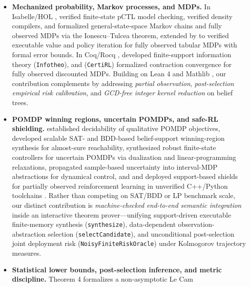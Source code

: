 \documentclass[11pt,a4paper]{article}
\providecommand{\tightlist}{\setlength{\itemsep}{2pt}\setlength{\parskip}{0pt}}
\begin{document}
\begin{itemize}
\tightlist
\item
  \textbf{Mechanized probability, Markov processes, and MDPs.} In
  Isabelle/HOL \citep{nipkowPaulsonWenzel2002}, \citet{hoelzlNipkow2012}
  verified finite-state pCTL model checking, \citet{eberl2015} verified
  density compilers, and \citet{hoelzl2017} formalized
  general-state-space Markov chains and fully observed MDPs via the
  Ionescu--Tulcea theorem, extended by \citet{schaeffelerAbdulaziz2023}
  to verified executable value and policy iteration for fully observed
  tabular MDPs with formal error bounds. In Coq/Rocq
  \citep{bertotCasteran2004}, \citet{affeldt2014} developed
  finite-support information theory (\texttt{Infotheo}), and
  \citet{vajjha2021} (\texttt{CertiRL}) formalized contraction
  convergence for fully observed discounted MDPs. Building on Lean 4
  \citep{mouraUllrich2021} and Mathlib \citep{mathlib2020}, our
  contribution complements \citet{schaeffelerAbdulaziz2023} by
  addressing \emph{partial observation}, \emph{post-selection empirical
  risk calibration}, and \emph{GCD-free integer kernel reduction} on
  belief trees.
\item
  \textbf{POMDP winning regions, uncertain POMDPs, and safe-RL
  shielding.} \citet{chatterjee2016} established decidability of
  qualitative POMDP objectives, \citet{junges2021} developed scalable
  SAT- and BDD-based belief-support winning-region synthesis for
  almost-sure reachability, \citet{cubuktepe2021} synthesized robust
  finite-state controllers for uncertain POMDPs via dualization and
  linear-programming relaxations, \citet{badings2023} propagated
  sample-based uncertainty into interval-MDP abstractions for dynamical
  control, and \citet{alshiekh2018} and \citet{carr2023} deployed
  support-based shields for partially observed reinforcement learning in
  unverified C++/Python toolchains \citep{kwiatkowska2011, dehnert2017}.
  Rather than competing on SAT/BDD or LP benchmark scale, our distinct
  contribution is \emph{machine-checked end-to-end semantic integration}
  inside an interactive theorem prover---unifying support-driven
  executable finite-memory synthesis (\texttt{synthesize}),
  data-dependent observation-abstraction selection
  (\texttt{selectCandidate}), and unconditional post-selection joint
  deployment risk (\texttt{NoisyFiniteRiskOracle}) under Kolmogorov
  trajectory measures.
\item
  \textbf{Statistical lower bounds, post-selection inference, and metric
  discipline.} Theorem 4 formalizes a non-asymptotic Le Cam

\end{itemize}
\end{document}
